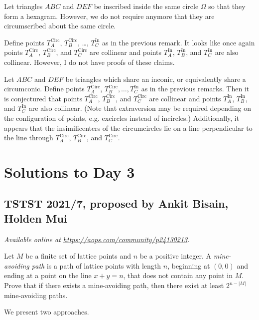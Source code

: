 \documentclass[11pt]{scrartcl}
\begin{document}
\bigskip

\begin{remark*}
Let triangles $ABC$ and $DEF$ be inscribed inside the same circle $\Omega$ so that they form a hexagram. However, we do not require anymore that they are circumscribed about the same circle.

Define points $T^\text{Circ}_A$, $T^\text{Circ}_B$, \dots, $T^\text{In}_C$ as
in the previous remark. It looks like once again points $T^\text{Circ}_A$,
$T^\text{Circ}_B$, and $T^\text{Circ}_C$ are collinear and points $T^\text{In}_A$,
$T^\text{In}_B$, and $T^\text{In}_C$ are also collinear. However, I do not
have proofs of these claims.
\end{remark*}

\begin{remark*}
  Let $ABC$ and $DEF$ be triangles which share an
  inconic, or equivalently share a circumconic.  Define points $T^\text{Circ}_A$,
  $T^\text{Circ}_B, \dots, T^\text{In}_C$ as in the previous remarks. Then
  it is conjectured that points $T^\text{Circ}_A$, $T^\text{Circ}_B$, and
  $T^\text{Circ}_C$ are collinear and points $T^\text{In}_A$, $T^\text{In}_B$,
  and $T^\text{In}_C$ are also collinear. (Note that extraversion may be
  required depending on the configuration of points, e.g. excircles instead of
  incircles.) Additionally, it appears that the insimilicenters of the
  circumcircles lie on a line perpendicular to the line through
  $T^\text{Circ}_A$, $T^\text{Circ}_B$, and $T^\text{Circ}_C$.
\end{remark*}
\pagebreak

\section{Solutions to Day 3}
\subsection{TSTST 2021/7, proposed by Ankit Bisain, Holden Mui}
\textsl{Available online at \url{https://aops.com/community/p24130213}.}
\begin{mdframed}[style=mdpurplebox,frametitle={Problem statement}]
Let $M$ be a finite set of lattice points
and $n$ be a positive integer.
A \emph{mine-avoiding path} is a path of lattice points with length $n$,
beginning at $(0,0)$ and ending at a point on the line $x+y=n$,
that does not contain any point in $M$.
Prove that if there exists a mine-avoiding path,
then there exist at least $2^{n-|M|}$ mine-avoiding paths.
\end{mdframed}
We present two approaches.
\end{document}

